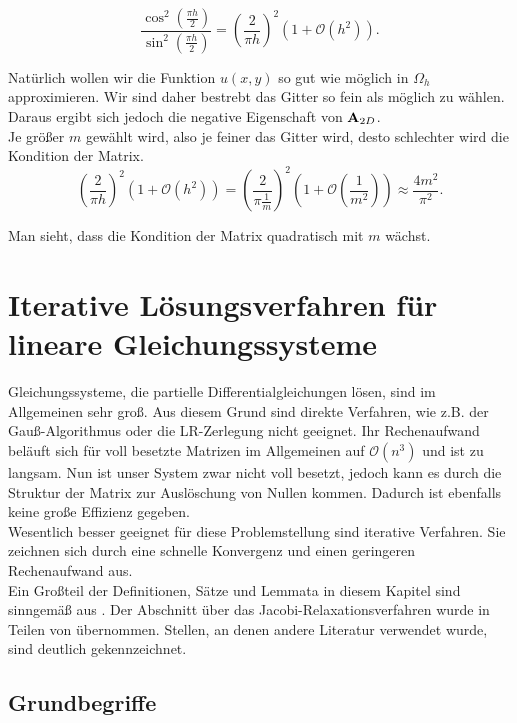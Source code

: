 \begin{equation}
\frac {\cos^{2} (\frac {\pi h} {2})} {\sin^{2} (\frac {\pi h} {2})} = \left( \frac {2} {\pi h} \right)^{2} (1 + \mathcal{O}(h^{2})).
\end{equation}

Natürlich wollen wir die Funktion $u(x,y)$ so gut wie möglich in $\Omega_{h}$ approximieren. Wir sind daher bestrebt das Gitter so fein als möglich zu wählen. Daraus ergibt sich jedoch die negative Eigenschaft von ${\textbf{A}}_{2D}$. \\
Je größer $m$ gewählt wird, also je feiner das Gitter wird, desto schlechter wird die Kondition der Matrix.
\begin{equation}
\left( \frac {2} {\pi h} \right)^{2} (1 + \mathcal{O}(h^{2})) = \left( \frac {2} {\pi \frac {1} {m}} \right)^{2} (1 + \mathcal{O}(\frac {1} {m^{2}})) \approx \frac {4m^{2}} {\pi^{2}}. \label{eq.kondition von PMatrix}
\end{equation}

Man sieht, dass die Kondition der Matrix quadratisch mit $m$ wächst.

\chapter{Iterative Lösungsverfahren für lineare Gleichungssysteme}\label{c.IterativeVerfahren}

Gleichungssysteme, die partielle Differentialgleichungen lösen, sind im Allgemeinen sehr groß. Aus diesem Grund sind direkte Verfahren, wie z.B. der Gauß-Algorithmus oder die LR-Zerlegung nicht geeignet. Ihr Rechenaufwand beläuft sich für voll besetzte Matrizen im Allgemeinen auf $\mathcal{O}(n^{3})$ und ist zu langsam. Nun ist unser System zwar nicht voll besetzt, jedoch kann es durch die Struktur der Matrix zur Auslöschung von Nullen kommen. Dadurch ist ebenfalls keine große Effizienz gegeben.\\
Wesentlich besser geeignet für diese Problemstellung sind iterative Verfahren. Sie zeichnen sich durch eine schnelle Konvergenz und einen geringeren Rechenaufwand aus.\\
Ein Großteil der Definitionen, Sätze und Lemmata in diesem Kapitel sind sinngemäß aus \cite{DR4}. Der Abschnitt über das Jacobi-Relaxationsverfahren wurde in Teilen von \cite{SAAD2} übernommen. Stellen, an denen andere Literatur verwendet wurde, sind deutlich gekennzeichnet.

\section{Grundbegriffe}\label{s.Grundbegriffe}

